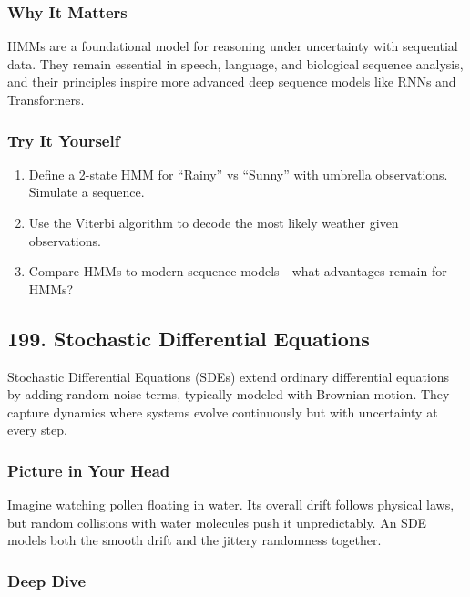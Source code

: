 \documentclass[
  letterpaper,
  DIV=11,
  numbers=noendperiod]{scrreprt}
\providecommand{\tightlist}{%
  \setlength{\itemsep}{0pt}\setlength{\parskip}{0pt}}
\begin{document}
\subsubsection{Why It Matters}\label{why-it-matters-95}

HMMs are a foundational model for reasoning under uncertainty with
sequential data. They remain essential in speech, language, and
biological sequence analysis, and their principles inspire more advanced
deep sequence models like RNNs and Transformers.

\subsubsection{Try It Yourself}\label{try-it-yourself-197}

\begin{enumerate}
\def\labelenumi{\arabic{enumi}.}
\tightlist
\item
  Define a 2-state HMM for ``Rainy'' vs ``Sunny'' with umbrella
  observations. Simulate a sequence.
\item
  Use the Viterbi algorithm to decode the most likely weather given
  observations.
\item
  Compare HMMs to modern sequence models---what advantages remain for
  HMMs?
\end{enumerate}

\subsection{199. Stochastic Differential
Equations}\label{stochastic-differential-equations}

Stochastic Differential Equations (SDEs) extend ordinary differential
equations by adding random noise terms, typically modeled with Brownian
motion. They capture dynamics where systems evolve continuously but with
uncertainty at every step.

\subsubsection{Picture in Your Head}\label{picture-in-your-head-198}

Imagine watching pollen floating in water. Its overall drift follows
physical laws, but random collisions with water molecules push it
unpredictably. An SDE models both the smooth drift and the jittery
randomness together.

\subsubsection{Deep Dive}\label{deep-dive-198}
\end{document}
